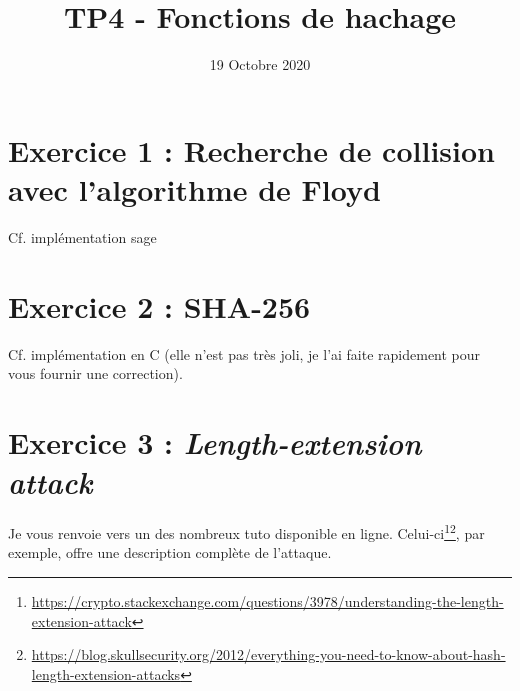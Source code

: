 \documentclass[french,a4paper,11pt]{exam}
\title{\textbf{TP4 - Fonctions de hachage}}
\date{19 Octobre 2020}
\begin{document}
	
	\section*{Exercice 1 : Recherche de collision avec l'algorithme de Floyd}
	
	Cf. implémentation sage
	
	\section*{Exercice 2 : SHA-256}

	Cf. implémentation en C (elle n'est pas très joli, je l'ai faite rapidement pour vous fournir une correction).
	
	\section*{Exercice 3 : \textit{Length-extension attack}}

	Je vous renvoie vers un des nombreux tuto disponible en ligne. Celui-ci\footnote{\url{https://crypto.stackexchange.com/questions/3978/understanding-the-length-extension-attack}}\footnote{\url{https://blog.skullsecurity.org/2012/everything-you-need-to-know-about-hash-length-extension-attacks}}, par exemple, offre une description complète de l'attaque.
	
	
\end{document}
